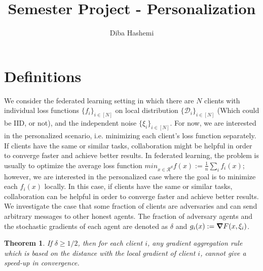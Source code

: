 \documentclass[a4paper,11pt]{article}
\newtheorem{theorem}{Theorem}[section]
\theoremstyle{definition}
\begin{document}
	
\title{Semester Project - Personalization}
\author{Diba Hashemi}
\date{}
\maketitle


\section{Definitions}
We consider the federated learning setting in which there are $N$ clients with individual loss functions $\{f_i\}_{i \in [N]}$ on local distribution $\{\mathcal{D}_i\}_{i \in [N]}$ (Which could be IID, or not), and the independent noise $\{\xi_i\}_{i \in [N]}$. 
For now, we are interested in the personalized scenario, i.e. minimizing each client's loss function separately. If clients have the same or similar tasks, collaboration might be helpful in order to converge faster and achieve better results. In federated learning, the problem is usually to optimize the average loss function 
$min_{x \in \mathcal{R}^d} f(x):= \frac 1 n \sum_{i} f_i(x)$; however, we are interested in the personalized case where the goal is to minimize each $f_i(x)$ locally. In this case, if clients have the same or similar tasks, collaboration can be helpful in order to converge faster and achieve better results.
\\ 
We investigate the case that some fraction of clients are adversaries and can send arbitrary messages to other honest agents. The fraction of adversary agents and the stochastic gradients of each agent are denoted as $\delta$ and $g_i(x):= \grad F(x, \xi_i)$.



\begin{theorem}
If $\delta \geq 1/2$, then for each client $i$, any gradient aggregation rule which is based on the distance with the local gradient of client $i$, cannot give a speed-up in convergence. 
\end{theorem}
\end{document}

